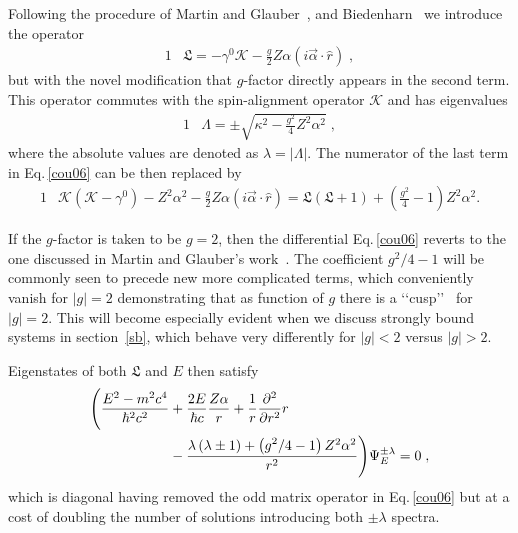 \documentclass[epj]{svjour}
\begin{document}
Following the procedure of Martin and Glauber~\cite{Martin:1958zz}, and Biedenharn~\cite{bi62} we introduce the operator
\begin{alignat}{1}
\label{cou07} &\mathfrak{L}=-\gamma^{0}\mathcal{K}-\frac{g}{2}Z\alpha(i\vec{\alpha}\cdot\hat{r})\;,
\end{alignat}
but with the novel modification that $g$-factor directly appears in the second term. This operator commutes with the spin-alignment operator $\mathcal{K}$ and has eigenvalues
\begin{alignat}{1}
\label{cou08} &\Lambda=\pm\sqrt{\kappa^{2}-\displaystyle\frac{\displaystyle g^{2}}{4}Z^{2}\alpha^{2}}\;,\end{alignat}
where the absolute values are denoted as $\lambda=|\Lambda|$. The numerator of the last term in Eq.\,\eqref{cou06} can be then replaced by
\begin{alignat}{1}
\label{cou09} &\mathcal{K}(\mathcal{K}\!-\!\gamma^{0})\!-\!\!Z^{2}\alpha^{2}\!\!-\!\frac{g}{2}Z\alpha(i\vec{\alpha}\cdot\hat{r})\!=\!\mathfrak{L}(\mathfrak{L}\!\!+\!\!1)\!+\!\!\left(\!\!\frac{g^{2}}{4}\!-\!1\!\right)\!\! Z^{2}\alpha^{2}\!.
\end{alignat}

If the $g$-factor is taken to be $g=2$, then the differential Eq.\,\eqref{cou06} reverts to the one discussed in Martin and Glauber\rq s work~\cite{Martin:1958zz}. The coefficient $g^{2}/4-1$ will be commonly seen to precede new more complicated terms, which conveniently vanish for $|g|=2$ demonstrating that as function of $g$ there is a \lq\lq cusp\rq\rq~\cite{Rafelski:2012ui} for $|g|=2$. This will become especially evident when we discuss strongly bound systems in section~\ref{sb}, which behave very differently for $|g|<2$ versus $|g|>2$. 

Eigenstates of both $\mathfrak{L}$ and $E$ then satisfy
\begin{alignat}{1}
\label{cou10} \Bigg(\frac{E^{2}-m^{2}c^{4}}{\hbar^{2}c^{2}}&+\frac{2E}{\hbar c}\frac{Z\alpha}{r}+\frac{1}{r}\frac{\partial^{2}}{\partial r^{2}}r\\ \notag &-\frac{\lambda\left(\lambda\pm1\right)+\left(\displaystyle g^{2}/4-1\right)Z^{2}\alpha^{2}}{r^{2}}\Bigg)\Psi_{E}^{\pm\lambda}=0\;,\end{alignat}
which is diagonal having removed the odd matrix operator in Eq.\,\eqref{cou06} but at a cost of doubling the number of solutions introducing both $\pm\lambda$ spectra. 
\end{document}
